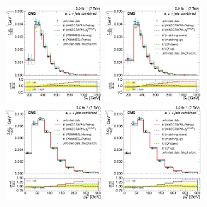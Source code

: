 \begin{figure}[hbtp]
     \includegraphics[width=0.32\textwidth]{Chapters/04_Analysis/04b_XSections/images/results/fit/7TeV/ST/central/normalised_xsection_combined_different_generators_with_bkgd_subtraction_results.pdf}\hfill
     \includegraphics[width=0.32\textwidth]{Chapters/04_Analysis/04b_XSections/images/results/fit/7TeV/ST/central/normalised_xsection_combined_systematics_shifts_with_bkgd_subtraction_results.pdf}\\
     \includegraphics[width=0.32\textwidth]{Chapters/04_Analysis/04b_XSections/images/results/fit/7TeV/WPT/central/normalised_xsection_combined_different_generators_with_bkgd_subtraction_results.pdf}\hfill
     \includegraphics[width=0.32\textwidth]{Chapters/04_Analysis/04b_XSections/images/results/fit/7TeV/WPT/central/normalised_xsection_combined_systematics_shifts_with_bkgd_subtraction_results.pdf}\hfill

\end{figure}
